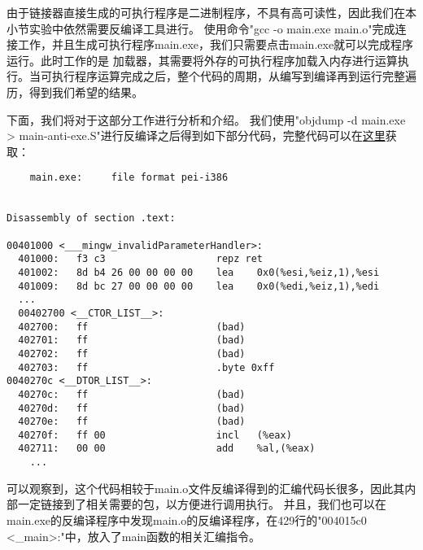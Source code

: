 \documentclass[UTF8]{ctexart}
\begin{document}
由于链接器直接生成的可执行程序是二进制程序，不具有高可读性，因此我们在本小节实验中依然需要反编译工具进行。
使用命令"gcc -o main.exe main.o"完成连接工作，并且生成可执行程序main.exe，我们只需要点击main.exe就可以完成程序运行。此时工作的是
加载器，其需要将外存的可执行程序加载入内存进行运算执行。当可执行程序运算完成之后，整个代码的周期，从编写到编译再到运行完整遍历，得到我们希望的结果。

下面，我们将对于这部分工作进行分析和介绍。
我们使用"objdump -d main.exe > main-anti-exe.S"进行反编译之后得到如下部分代码，完整代码可以在\href{https://paste.ubuntu.com/p/pR9mJ3hJx5/}{这里}获取：
\begin{lstlisting}
    main.exe:     file format pei-i386


Disassembly of section .text:

00401000 <___mingw_invalidParameterHandler>:
  401000:	f3 c3                	repz ret 
  401002:	8d b4 26 00 00 00 00 	lea    0x0(%esi,%eiz,1),%esi
  401009:	8d bc 27 00 00 00 00 	lea    0x0(%edi,%eiz,1),%edi
  ...
  00402700 <__CTOR_LIST__>:
  402700:	ff                   	(bad)  
  402701:	ff                   	(bad)  
  402702:	ff                   	(bad)  
  402703:	ff                   	.byte 0xff
0040270c <__DTOR_LIST__>:
  40270c:	ff                   	(bad)  
  40270d:	ff                   	(bad)  
  40270e:	ff                   	(bad)  
  40270f:	ff 00                	incl   (%eax)
  402711:	00 00                	add    %al,(%eax)
	...
\end{lstlisting}
可以观察到，这个代码相较于main.o文件反编译得到的汇编代码长很多，因此其内部一定链接到了相关需要的包，以方便进行调用执行。
并且，我们也可以在main.exe的反编译程序中发现main.o的反编译程序，在429行的"004015c0 <\_main>:"中，放入了main函数的相关汇编指令。
\end{document}

